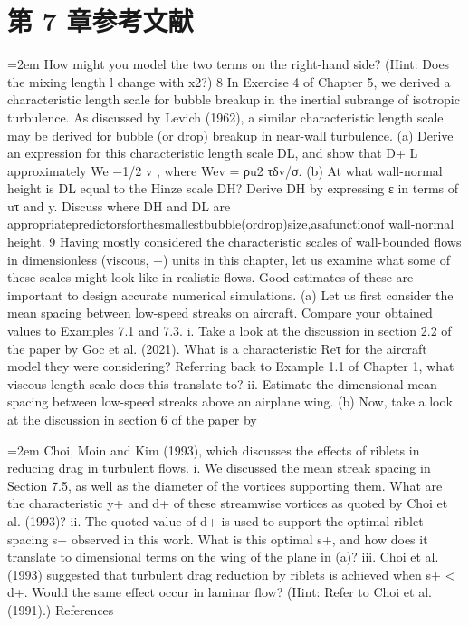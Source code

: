 \documentclass[12pt,a4paper,openany,fontset=none]{ctexbook}
\begin{document}
\section*{第 7 章参考文献}
\par\hangindent=2em How might you model the two terms on the right-hand side? (Hint: Does the mixing length l change with x2?) 8 In Exercise 4 of Chapter 5, we derived a characteristic length scale for bubble breakup in the inertial subrange of isotropic turbulence. As discussed by Levich (1962), a similar characteristic length scale may be derived for bubble (or drop) breakup in near-wall turbulence. (a) Derive an expression for this characteristic length scale DL, and show that D+ L  approximately  We −1/2 v , where Wev = ρu2 τδv/σ. (b) At what wall-normal height is DL equal to the Hinze scale DH? Derive DH by expressing ε in terms of uτ and y. Discuss where DH and DL are appropriatepredictorsforthesmallestbubble(ordrop)size,asafunctionof wall-normal height. 9 Having mostly considered the characteristic scales of wall-bounded flows in dimensionless (viscous, +) units in this chapter, let us examine what some of these scales might look like in realistic flows. Good estimates of these are important to design accurate numerical simulations. (a) Let us first consider the mean spacing between low-speed streaks on aircraft. Compare your obtained values to Examples 7.1 and 7.3. i. Take a look at the discussion in section 2.2 of the paper by Goc et al. (2021). What is a characteristic Reτ for the aircraft model they were considering? Referring back to Example 1.1 of Chapter 1, what viscous length scale does this translate to? ii. Estimate the dimensional mean spacing between low-speed streaks above an airplane wing. (b) Now, take a look at the discussion in section 6 of the paper by
\par\hangindent=2em Choi, Moin and Kim (1993), which discusses the effects of riblets in reducing drag in turbulent flows. i. We discussed the mean streak spacing in Section 7.5, as well as the diameter of the vortices supporting them. What are the characteristic y+ and d+ of these streamwise vortices as quoted by Choi et al. (1993)? ii. The quoted value of d+ is used to support the optimal riblet spacing s+ observed in this work. What is this optimal s+, and how does it translate to dimensional terms on the wing of the plane in (a)? iii. Choi et al. (1993) suggested that turbulent drag reduction by riblets is achieved when s+ < d+. Would the same effect occur in laminar flow? (Hint: Refer to Choi et al. (1991).) References
\end{document}
